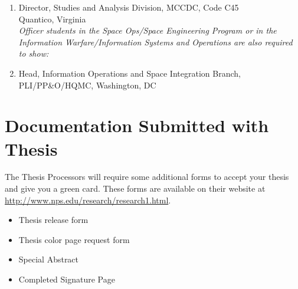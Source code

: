 \begin{enumerate}
  \item Director, Studies and Analysis Division, MCCDC, Code C45\\
    Quantico, Virginia\\

  \textit{Officer students in the Space Ops/Space Engineering Program or in the
    Information Warfare/Information Systems and Operations are also
    required to show:}

  \item Head, Information Operations and Space Integration Branch,\\
    PLI/PP\&O/HQMC, Washington, DC
\end{enumerate}

\section{Documentation Submitted with Thesis}
The Thesis Processors will require some additional forms to accept
your thesis and give you a green card.  These forms are available on
their website at \url{http://www.nps.edu/research/research1.html}.

\begin{itemize}
  \item Thesis release form
  \item Thesis color page request form
  \item Special Abstract
  \item Completed Signature Page
\end{itemize}
